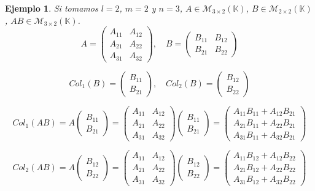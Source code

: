 \documentclass[12pt]{book}
\newtheorem{ejem}{Ejemplo}
\def\K{\mathbb{K}}
\def\M{\mathcal{M}}
\def\B{\mathcal{B}}
\begin{document}
\begin{ejem}
Si tomamos $l=2$, $m=2$ y $n=3$, $A\in\M_{3\times 2}(\K)$, $B\in\M_{2\times 2}(\K)$, $AB\in\M_{3\times 2}(\K)$.
$$A=\left(\begin{array}{cc} A_{11}&A_{12}\\ A_{21}&A_{22}\\ A_{31}&A_{32}\end{array}\right),\quad 
B=\left(\begin{array}{cc} B_{11}&B_{12}\\B_{21}&B_{22}\end{array}\right)$$

$$Col_1(B)=\left(\begin{array}{c} B_{11}\\B_{21}\end{array}\right),\quad Col_2(B)=\left(\begin{array}{c} B_{12}\\B_{22}\end{array}\right)$$

$$Col_1(AB)=A\left(\begin{array}{c} B_{11}\\B_{21}\end{array}\right)=
\left(\begin{array}{cc} A_{11}&A_{12}\\ A_{21}&A_{22}\\ A_{31}&A_{32}\end{array}\right)\left(\begin{array}{c} B_{11}\\B_{21}\end{array}\right)=
\left(\begin{array}{c} A_{11}B_{11}+A_{12}B_{21}\\ A_{21}B_{11}+A_{22}B_{21}\\ A_{31}B_{11}+A_{32}B_{21}\end{array}\right)$$

$$Col_2(AB)=A\left(\begin{array}{c} B_{12}\\B_{22}\end{array}\right)=
\left(\begin{array}{cc} A_{11}&A_{12}\\ A_{21}&A_{22}\\ A_{31}&A_{32}\end{array}\right)\left(\begin{array}{c} B_{12}\\B_{22}\end{array}\right)=
\left(\begin{array}{c} A_{11}B_{12}+A_{12}B_{22}\\ A_{21}B_{12}+A_{22}B_{22}\\ A_{31}B_{12}+A_{32}B_{22}\end{array}\right)$$


\end{ejem}
\end{document}
